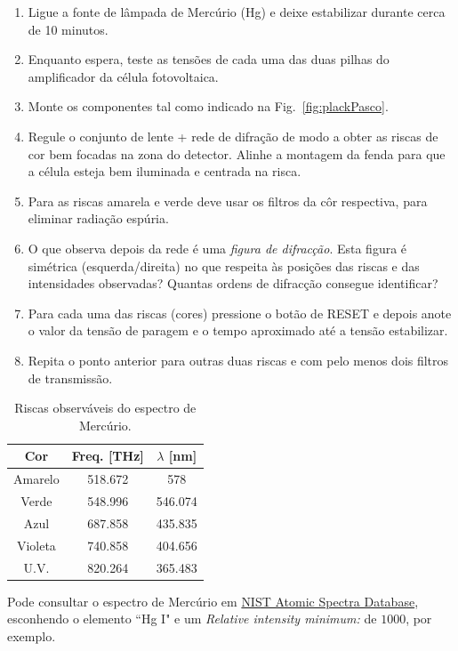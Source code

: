 \documentclass[a4paper,12pt]{article}  %
\begin{document}
\begin{enumerate}
\item Ligue a fonte de lâmpada de Mercúrio (Hg) e deixe estabilizar durante cerca de 10 minutos.
\item Enquanto espera, teste as tensões de cada uma das duas pilhas do amplificador da célula fotovoltaica.
\item Monte os componentes tal como indicado na Fig.~\ref{fig:plackPasco}.
\item Regule o conjunto de lente + rede de difração de modo a obter as riscas de cor bem focadas na zona do detector. Alinhe a montagem da fenda para que a célula esteja bem iluminada e centrada na risca.
\item Para as riscas amarela e verde deve usar os filtros da côr respectiva, para eliminar radiação espúria.
\item O que observa depois da rede é uma \emph{figura de difracção}. 
Esta figura é simétrica (esquerda/direita) no que respeita às posições das riscas e das intensidades observadas? Quantas ordens de difracção consegue identificar?
\item Para cada uma das riscas (cores) pressione o botão de RESET e depois anote o valor da tensão de paragem e o tempo aproximado até a tensão estabilizar.
\item Repita o ponto anterior para outras duas riscas  e com pelo menos dois filtros de transmissão.
\end{enumerate}


\begin{table}[!hbp]
\begin{center}
	\begin{tabular}{|c|c|c|}
	\hline
	Cor  & Freq. [THz] & $\lambda$ [nm]  \\
	\hline
	Amarelo & 518.672 & 578 \\
	Verde & 548.996 & 546.074\\
	Azul & 687.858  & 435.835 \\
	Violeta & 740.858  & 404.656\\
	U.V.    & 820.264  & 365.483 \\
	\hline
 	\end{tabular}
	\caption{Riscas observáveis do espectro de Mercúrio.} 
	\label{tab:Hg}
	\end{center}
\end{table}

Pode consultar o espectro de Mercúrio em  \href{http://physics.nist.gov/asd}{
NIST Atomic Spectra Database}, esconhendo o elemento ``Hg I" e um \emph{Relative intensity minimum:} de $1000$, por exemplo. 	  	



\end{document}
